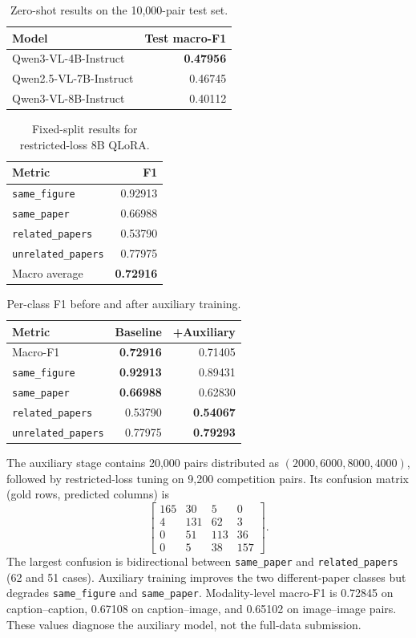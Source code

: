\documentclass[11pt]{article}
\newcommand{\sfclass}{\texttt{same\_figure}}
\newcommand{\spclass}{\texttt{same\_paper}}
\newcommand{\rpclass}{\texttt{related\_papers}}
\newcommand{\upclass}{\texttt{unrelated\_papers}}
\begin{document}
\begin{table}[h]
\centering
\small
\begin{tabular}{lr}
\toprule
Model & Test macro-F1 \\
\midrule
Qwen3-VL-4B-Instruct & \textbf{0.47956} \\
Qwen2.5-VL-7B-Instruct & 0.46745 \\
Qwen3-VL-8B-Instruct & 0.40112 \\
\bottomrule
\end{tabular}
\caption{Zero-shot results on the 10,000-pair test set.}
\label{tab:zero}
\end{table}

\begin{table}[h]
\centering
\small
\begin{tabular}{lr}
\toprule
Metric & F1 \\
\midrule
\sfclass{} & 0.92913 \\
\spclass{} & 0.66988 \\
\rpclass{} & 0.53790 \\
\upclass{} & 0.77975 \\
\midrule
Macro average & \textbf{0.72916} \\
\bottomrule
\end{tabular}
\caption{Fixed-split results for restricted-loss 8B QLoRA.}
\label{tab:val}
\end{table}

\begin{table}[h]
\centering
\small
\begin{tabular}{lrr}
\toprule
Metric & Baseline & +Auxiliary \\
\midrule
Macro-F1 & \textbf{0.72916} & 0.71405 \\
\sfclass{} & \textbf{0.92913} & 0.89431 \\
\spclass{} & \textbf{0.66988} & 0.62830 \\
\rpclass{} & 0.53790 & \textbf{0.54067} \\
\upclass{} & 0.77975 & \textbf{0.79293} \\
\bottomrule
\end{tabular}
\caption{Per-class F1 before and after auxiliary training.}
\label{tab:aux}
\end{table}

The auxiliary stage contains 20,000 pairs distributed as $(2000,6000,8000,4000)$, followed by restricted-loss tuning on 9,200 competition pairs.  Its confusion matrix (gold rows, predicted columns) is
\begin{equation}
\begin{bmatrix}
165&30&5&0\\
4&131&62&3\\
0&51&113&36\\
0&5&38&157
\end{bmatrix}.
\end{equation}
The largest confusion is bidirectional between \spclass{} and \rpclass{} (62 and 51 cases).  Auxiliary training improves the two different-paper classes but degrades \sfclass{} and \spclass{}.  Modality-level macro-F1 is 0.72845 on caption--caption, 0.67108 on caption--image, and 0.65102 on image--image pairs.  These values diagnose the auxiliary model, not the full-data submission.
\end{document}
